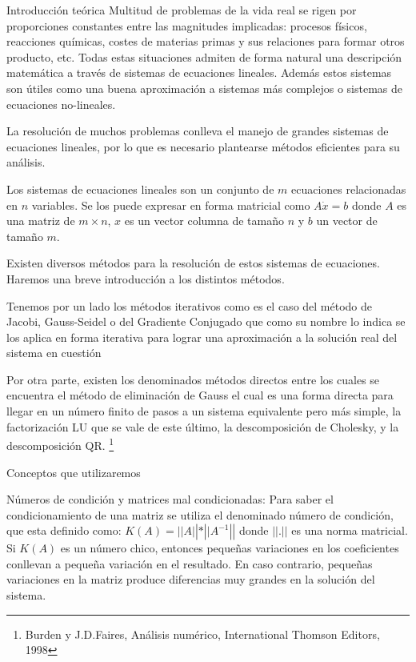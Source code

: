 \begin{section}{Introducción teórica}	
	Multitud de problemas de la vida real se rigen por proporciones constantes entre las magnitudes implicadas: procesos físicos, reacciones químicas, costes de materias primas y sus relaciones para formar otros producto, etc.
	Todas estas situaciones admiten de forma natural una descripción matemática a través de sistemas de ecuaciones lineales.
	Además estos sistemas son útiles como una buena aproximación a sistemas más complejos o sistemas de ecuaciones no-lineales.
	
	La resolución de muchos problemas conlleva el manejo de grandes sistemas de ecuaciones lineales, por lo que es necesario plantearse métodos eficientes para su análisis.
	
	Los sistemas de ecuaciones lineales son un conjunto de $m$ ecuaciones relacionadas en $n$ variables. Se los puede expresar en forma matricial como $A \dot x = b$ donde $A$ es una matriz de $m \times n$, $x$ es un vector columna de tamaño $n$ y $b$ un vector de tamaño $m$.
	
	Existen diversos métodos para la resolución de estos sistemas de ecuaciones. Haremos una breve introducción a los distintos métodos.
	
	Tenemos por un lado los métodos iterativos como es el caso del método de Jacobi, Gauss-Seidel o del Gradiente Conjugado que como su nombre lo indica se los aplica en forma iterativa para lograr una aproximación a la solución real del sistema en cuestión
	
	Por otra parte, existen los denominados métodos directos entre los cuales se encuentra el método de eliminación de Gauss el cual es una forma directa para llegar en un número finito de pasos a un sistema equivalente pero más simple, la factorización LU que se vale de este último, la descomposición de Cholesky, y la descomposición QR.	\footnote{Burden y J.D.Faires, Análisis numérico, International Thomson Editors, 1998}
	
	\begin{subsection}{Conceptos que utilizaremos}
		\begin{subsubsection}{Números de condición y matrices mal condicionadas:}
			Para saber el condicionamiento de una matriz se utiliza el denominado número de condición, que esta definido como: $K(A) = \left||A \right|| * \left||A^{-1} \right||$ donde $\left|| . \right||$ es una norma matricial.
			Si $K(A)$ es un número chico, entonces pequeñas variaciones en los coeficientes conllevan a pequeña variación en el resultado. En caso contrario, pequeñas variaciones en la matriz produce diferencias muy grandes en la solución del sistema.
			

\end{subsubsection}
\end{subsection}
\end{section}
